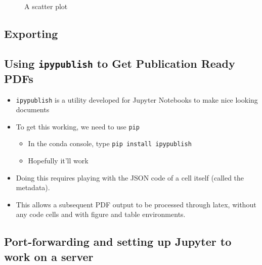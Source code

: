 \documentclass[10pt,parskip=half,
	toc=sectionentrywithdots,
	bibliography=totocnumbered,
	captions=tableheading,numbers=noendperiod]{scrartcl}
\providecommand{\tightlist}{%
  \setlength{\itemsep}{0pt}\setlength{\parskip}{0pt}}
\begin{document}
\begin{figure}[H]\begin{center}\end{center}\caption{A scatter plot}\label{fig:flabel}
    \end{figure}

\hypertarget{exporting}{%
\subsection{Exporting}\label{exporting}}

\hypertarget{using-ipypublish-to-get-publication-ready-pdfs}{%
\subsection{\texorpdfstring{Using \texttt{ipypublish} to Get Publication
Ready
PDFs}{Using ipypublish to Get Publication Ready PDFs}}\label{using-ipypublish-to-get-publication-ready-pdfs}}

\begin{itemize}
\tightlist
\item
  \texttt{ipypublish} is a utility developed for Jupyter Notebooks to
  make nice looking documents
\item
  To get this working, we need to use \texttt{pip}

  \begin{itemize}
  \tightlist
  \item
    In the conda console, type \texttt{pip\ install\ ipypublish}
  \item
    Hopefully it'll work
  \end{itemize}
\end{itemize}

\begin{itemize}
\tightlist
\item
  Doing this requires playing with the JSON code of a cell itself
  (called the metadata).
\item
  This allows a subsequent PDF output to be processed through latex,
  without any code cells and with figure and table environments.
\end{itemize}

\hypertarget{port-forwarding-and-setting-up-jupyter-to-work-on-a-server}{%
\subsection{Port-forwarding and setting up Jupyter to work on a
server}\label{port-forwarding-and-setting-up-jupyter-to-work-on-a-server}}
\end{document}
